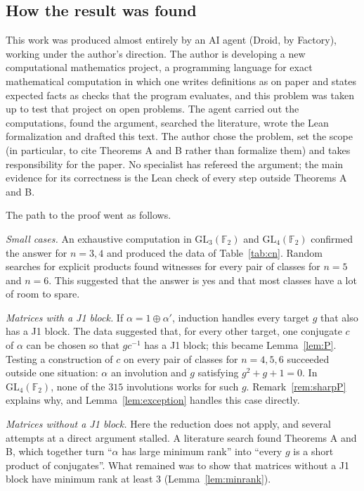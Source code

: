 \documentclass[11pt]{amsart}
\theoremstyle{definition}
\theoremstyle{remark}
\newcommand{\F}{\mathbb{F}_2}
\newcommand{\GL}{\mathrm{GL}}
\begin{document}
\subsection{How the result was found}
This work was produced almost entirely by an AI agent (Droid, by Factory), working under the
author's direction. The author is developing a new computational mathematics project, a
programming language for exact mathematical computation in which one writes definitions as on
paper and states expected facts as checks that the program evaluates, and this problem was taken
up to test that project on open problems. The agent carried out the computations, found the
argument, searched the literature, wrote the Lean formalization and drafted this text. The author
chose the problem, set the scope (in particular, to cite Theorems A and B rather than formalize
them) and takes responsibility for the paper. No specialist has refereed the argument; the main
evidence for its correctness is the Lean check of every step outside Theorems A and B.

The path to the proof went as follows.

\emph{Small cases.} An exhaustive computation in $\GL_3(\F)$ and $\GL_4(\F)$ confirmed the answer
for $n=3,4$ and produced the data of Table~\ref{tab:cn}. Random searches for explicit products
found witnesses for every pair of classes for $n=5$ and $n=6$. This suggested that the answer is
yes and that most classes have a lot of room to spare.

\emph{Matrices with a J1 block.} If $\alpha=1\oplus\alpha'$, induction handles every target $g$
that also has a J1 block. The data suggested that, for every other target, one conjugate $c$ of
$\alpha$ can be chosen so that $gc^{-1}$ has a J1 block; this became Lemma~\ref{lem:P}. Testing a
construction of $c$ on every pair of classes for $n=4,5,6$ succeeded outside one situation:
$\alpha$ an involution and $g$ satisfying $g^2+g+1=0$. In $\GL_4(\F)$, none of the $315$ involutions works for
such $g$. Remark~\ref{rem:sharpP} explains why, and Lemma~\ref{lem:exception} handles this case
directly.

\emph{Matrices without a J1 block.} Here the reduction does not apply, and several attempts at a
direct argument stalled. A literature search found Theorems A and B, which together turn
``$\alpha$ has large minimum rank'' into ``every $g$ is a short product of conjugates''. What
remained was to show that matrices without a J1 block have minimum rank at least $3$
(Lemma~\ref{lem:minrank}).
\end{document}
